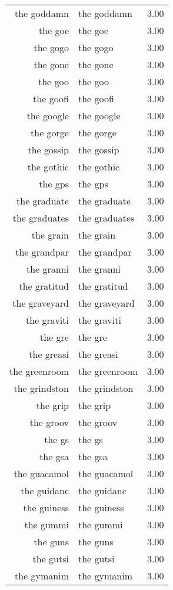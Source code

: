 \begin{table}[ht]
\begin{tabular}{rlr}
  the goddamn & the goddamn & 3.00 \\ 
  the goe & the goe & 3.00 \\ 
  the gogo & the gogo & 3.00 \\ 
  the gone & the gone & 3.00 \\ 
  the goo & the goo & 3.00 \\ 
  the goofi & the goofi & 3.00 \\ 
  the google & the google & 3.00 \\ 
  the gorge & the gorge & 3.00 \\ 
  the gossip & the gossip & 3.00 \\ 
  the gothic & the gothic & 3.00 \\ 
  the gps & the gps & 3.00 \\ 
  the graduate & the graduate & 3.00 \\ 
  the graduates & the graduates & 3.00 \\ 
  the grain & the grain & 3.00 \\ 
  the grandpar & the grandpar & 3.00 \\ 
  the granni & the granni & 3.00 \\ 
  the gratitud & the gratitud & 3.00 \\ 
  the graveyard & the graveyard & 3.00 \\ 
  the graviti & the graviti & 3.00 \\ 
  the gre & the gre & 3.00 \\ 
  the greasi & the greasi & 3.00 \\ 
  the greenroom & the greenroom & 3.00 \\ 
  the grindston & the grindston & 3.00 \\ 
  the grip & the grip & 3.00 \\ 
  the groov & the groov & 3.00 \\ 
  the gs & the gs & 3.00 \\ 
  the gsa & the gsa & 3.00 \\ 
  the guacamol & the guacamol & 3.00 \\ 
  the guidanc & the guidanc & 3.00 \\ 
  the guiness & the guiness & 3.00 \\ 
  the gummi & the gummi & 3.00 \\ 
  the guns & the guns & 3.00 \\ 
  the gutsi & the gutsi & 3.00 \\ 
  the gymanim & the gymanim & 3.00 \\ 

\end{tabular}
\end{table}

